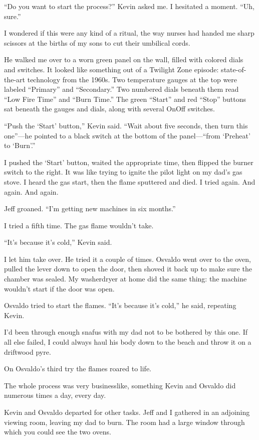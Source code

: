 \documentclass[12pt]{book}
\begin{document}
``Do you want to start the process?'' Kevin asked me. I hesitated a moment. ``Uh, sure.''

I wondered if this were any kind of a ritual, the way nurses had handed me sharp scissors at the births of my sons to cut their umbilical cords.

He walked me over to a worn green panel on the wall, filled with colored dials and switches. It looked like something out of a Twilight Zone episode: state-of-the-art technology from the 1960s. Two temperature gauges at the top were labeled ``Primary'' and ``Secondary.'' Two numbered dials beneath them read ``Low Fire Time'' and ``Burn Time.'' The green ``Start'' and red ``Stop'' buttons sat beneath the gauges and dials, along with several On\/Off switches.

``Push the `Start' button,'' Kevin said. ``Wait about five seconds, then turn this one''---he pointed to a black switch at the bottom of the panel---``from `Preheat' to `Burn'.''

I pushed the `Start' button, waited the appropriate time, then flipped the burner switch to the right. It was like trying to ignite the pilot light on my dad's gas stove. I heard the gas start, then the flame sputtered and died. I tried again. And again. And again.

Jeff groaned. ``I'm getting new machines in six months.''

I tried a fifth time. The gas flame wouldn't take.

``It's because it's cold,'' Kevin said.

I let him take over. He tried it a couple of times. Osvaldo went over to the oven, pulled the lever down to open the door, then shoved it back up to make sure the chamber was sealed. My washer\/dryer at home did the same thing: the machine wouldn't start if the door was open.

Osvaldo tried to start the flames. ``It's because it's cold,'' he said, repeating Kevin.

I'd been through enough snafus with my dad not to be bothered by this one. If all else failed, I could always haul his body down to the beach and throw it on a driftwood pyre.

On Osvaldo's third try the flames roared to life.

The whole process was very businesslike, something Kevin and Osvaldo did numerous times a day, every day.

Kevin and Osvaldo departed for other tasks. Jeff and I gathered in an adjoining viewing room, leaving my dad to burn. The room had a large window through which you could see the two ovens.
\end{document}
